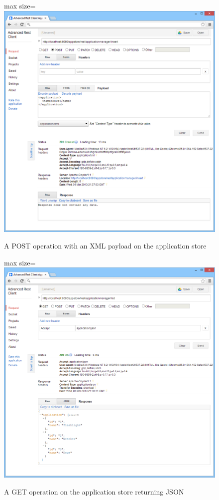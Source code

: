 \documentclass[]{report}
\let\Oldincludegraphics\includegraphics
\renewcommand{\includegraphics}[1]{
\begin{adjustbox}{max size={\textwidth}{\textheight}}
    \Oldincludegraphics[scale=0.6]{#1}%
\end{adjustbox}
}
\begin{document}
\begin{figure}[htbp]
\centering
\includegraphics{img/web_services/rest_client_1.png}
\caption{A POST operation with an XML payload on the application store}
\end{figure}

\begin{figure}[htbp]
\centering
\includegraphics{img/web_services/rest_client_2.png}
\caption{A GET operation on the application store returning JSON}
\end{figure}
\end{document}

